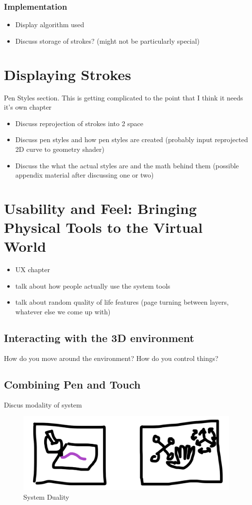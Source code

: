 \documentclass[12pt]{report}
\begin{document}
\subsection{Implementation}
\begin{itemize}
\item Display algorithm used
\item Discuss storage of strokes? (might not be particularly special)
\end{itemize}

\pagebreak
\chapter{Displaying Strokes}
Pen Styles section. This is getting complicated to the point that I think it needs it's own chapter
\begin{itemize}
\item Discuss reprojection of strokes into 2 space
\item Discuss pen styles and how pen styles are created (probably input reprojected 2D curve to geometry shader)
\item Discuss the what the actual styles are and the math behind them (possible appendix material after discussing one or two)
\end{itemize}
\pagebreak
\chapter{Usability and Feel: Bringing Physical Tools to the Virtual World}
\begin{itemize}
\item UX chapter
\item talk about how people actually use the system tools
\item talk about random quality of life features (page turning between layers, whatever else we come up with)
\end{itemize}
\section{Interacting with the 3D environment}
How do you move around the environment? How do you control things?
\section{Combining Pen and Touch}
Discus modality of system
\begin{figure}[h]
\includegraphics[width=0.9\linewidth]{Duality}
\caption{System Duality}
\end{figure}
\end{document}
